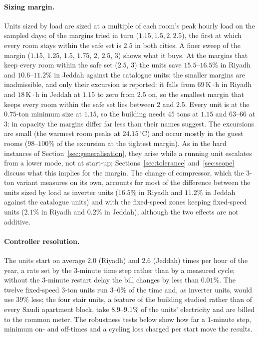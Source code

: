 \documentclass[10pt,a4paper,twocolumn]{article}
\theoremstyle{definition}
\begin{document}
\paragraph{Sizing margin.} Units sized by load are sized at a multiple of each room's peak hourly load on the sampled days; of the margins tried in turn ($1.15, 1.5, 2, 2.5$), the first at which every room stays within the safe set is $2.5$ in both cities. A finer sweep of the margin ($1.15$, $1.25$, $1.5$, $1.75$, $2$, $2.5$, $3$) shows what it buys. At the margins that keep every room within the safe set ($2.5$, $3$) the units save $15.5$--$16.5$\% in Riyadh and $10.6$--$11.2$\% in Jeddah against the catalogue units; the smaller margins are inadmissible, and only their excursion is reported: it falls from $69\,\mathrm{K{\cdot}h}$ in Riyadh and $18\,\mathrm{K{\cdot}h}$ in Jeddah at $1.15$ to zero from $2.5$ on, so the smallest margin that keeps every room within the safe set lies between $2$ and $2.5$. Every unit is at the $0.75$-ton minimum size at $1.15$, so the building needs $45$ tons at $1.15$ and $63$--$66$ at $3$: in capacity the margins differ far less than their names suggest. The excursions are small (the warmest room peaks at $24.15$\,$^{\circ}$C) and occur mostly in the guest rooms ($98$--$100$\% of the excursion at the tightest margin). As in the hard instances of Section~\ref{sec:generalisation}, they arise while a running unit escalates from a lower mode, not at start-up; Sections~\ref{sec:tolerance} and~\ref{sec:scope} discuss what this implies for the margin. The change of compressor, which the 3-ton variant measures on its own, accounts for most of the difference between the units sized by load as inverter units ($16.5\%$ in Riyadh and $11.2\%$ in Jeddah against the catalogue units) and with the fixed-speed zones keeping fixed-speed units ($2.1\%$ in Riyadh and $0.2\%$ in Jeddah), although the two effects are not additive.

\paragraph{Controller resolution.} The units start on average $2.0$ (Riyadh) and $2.6$ (Jeddah) times per hour of the year, a rate set by the $3$-minute time step rather than by a measured cycle; without the $3$-minute restart delay the bill changes by less than $0.01\%$. The twelve fixed-speed 3-ton units run $3$--$6$\% of the time and, as inverter units, would use $39$\% less; the four stair units, a feature of the building studied rather than of every Saudi apartment block, take $8.9$--$9.1$\% of the units' electricity and are billed to the common meter. The robustness tests below show how far a $1$-minute step, minimum on- and off-times and a cycling loss charged per start move the results.
\end{document}
